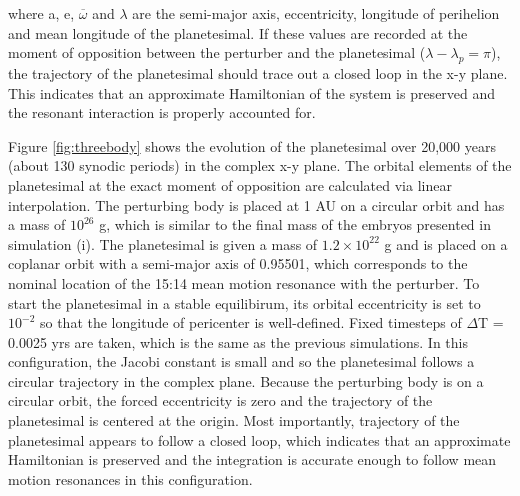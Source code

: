 \noindent where a, e, $\overline{\omega}$ and $\lambda$ are the semi-major axis, eccentricity, longitude of perihelion and mean 
longitude of the planetesimal. If these values are recorded at the moment of opposition between the perturber and the 
planetesimal ($\lambda - \lambda_{p} = \pi$), the trajectory of the planetesimal should trace out a closed loop in the x-y plane. 
This indicates that an approximate Hamiltonian of the system is preserved and the resonant interaction is properly accounted for.

Figure \ref{fig:threebody} shows the evolution of the planetesimal over 20,000 years (about 130 synodic periods) in the complex 
x-y plane. The orbital elements of the planetesimal at the exact moment of opposition are calculated via linear interpolation. The 
perturbing body is placed at 1 AU on a circular orbit and has a mass of $10^{26}$ g, which is similar to the final mass of the 
embryos presented in simulation (i). The planetesimal is given a mass of $1.2 \times 10^{22}$ g and is placed on a coplanar 
orbit with a semi-major axis of 0.95501, which corresponds to the nominal location of the 15:14 mean motion resonance with the 
perturber. To start the planetesimal in a stable equilibirum, its orbital eccentricity is set to $10^{-2}$ so that the longitude of 
pericenter is well-defined. Fixed timesteps of $\Delta$T = 0.0025 yrs are taken, which is the same as the previous simulations. In 
this configuration, the Jacobi constant is small and so the planetesimal follows a circular trajectory in the complex plane. 
Because the perturbing body is on a circular orbit, the forced eccentricity is zero and the trajectory of the planetesimal is 
centered at the origin. Most importantly, trajectory of the planetesimal appears to follow a closed loop, which indicates that an 
approximate Hamiltonian is preserved and the integration is accurate enough to follow mean motion resonances in this 
configuration.


